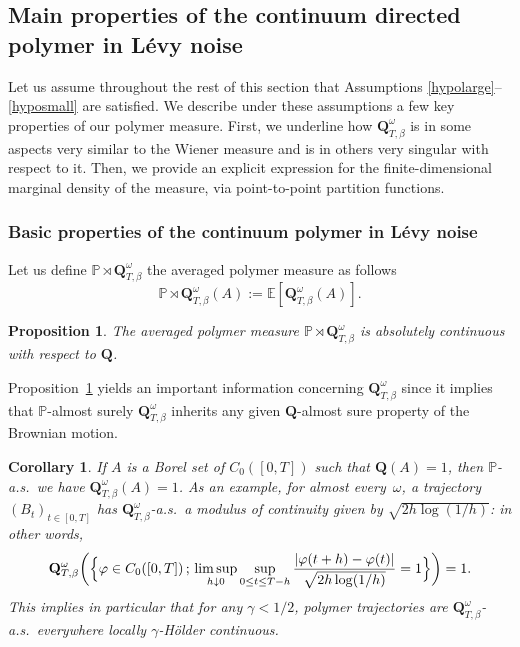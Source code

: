 \documentclass[11pt]{article}
\newcommand{\Subsection}{\subsection}
\numberwithin{equation}{section}
\newtheorem{proposition}[theorem]{Proposition}
\newtheorem{cor}[theorem]{Corollary}
\theoremstyle{definition}
\newcommand{\bQ}{{\ensuremath{\mathbf Q}} }
\newcommand{\bbE}{{\ensuremath{\mathbb E}} }
\newcommand{\bbP}{{\ensuremath{\mathbb P}} }
\let\gb\beta
\let\go\omega
\begin{document}
\Subsection{Main properties of the continuum directed polymer in Lévy noise}
\label{sec:mainprop}

Let us assume throughout the rest of this section that Assumptions \eqref{hypolarge}--\eqref{hyposmall} are satisfied.
We describe under these assumptions a few key properties of our polymer measure. First, we underline how $\bQ^{\go}_{T,\beta}$ is in some aspects very similar to the Wiener measure and is in others very singular with respect to it.
Then, we provide an explicit expression for the finite-dimensional marginal density of the measure, via point-to-point partition functions.

\subsubsection{Basic properties of the continuum polymer in Lévy noise}
\label{bazics}

Let us define $\bbP\rtimes\bQ^{\go}_{T,\beta}$ the averaged polymer measure as follows
\begin{equation}
\bbP\rtimes\bQ^{\go}_{T,\beta}(A):= \bbE[\bQ^{\go}_{T,\beta}(A) ].
\end{equation}

\begin{proposition} \label{abzolute}
The averaged polymer measure
$\bbP\rtimes \bQ^{\go}_{T,\beta}$ is absolutely continuous with respect to $\bQ$.
\end{proposition}

 Proposition~\ref{abzolute} yields an important information concerning $\bQ^{\go}_{T,\beta}$ since it implies that $\bbP$-almost surely $ \bQ^{\go}_{T,\beta}$ inherits any given $\bQ$-almost sure property of the Brownian motion.

\begin{cor}
If $A$ is a Borel set of $C_0([0,T])$ such that $\bQ(A)=1$, then $\bbP$-a.s.\ we have $ \bQ^{\go}_{T,\beta}(A)=1$.
As an example,
for almost every~$\go$, a trajectory $(B_t)_{t\in [0,T]}$
has $\bQ_{T,\gb}^{\go}$-a.s.\ a modulus of continuity
given by $\sqrt{2h \log(1/h)}$: in other words,
\[
\bQ_{T,\gb}^{\go} \bigg(\Bigl\{ \varphi \in C_0([0,T]) \,; \, \limsup_{h\downarrow 0} \sup_{ 0\leq t \leq T-h} \frac{|\varphi(t+h) - \varphi(t)|}{ \sqrt{2h \log(1/h)}} =1 \Bigr\} \bigg) =1.
\]
This implies in particular that for any $\gamma<1/2$,
polymer trajectories are $\bQ_{T,\gb}^{\go}$-a.s.\ everywhere locally $\gamma$-Hölder continuous.
\end{cor}
\end{document}
